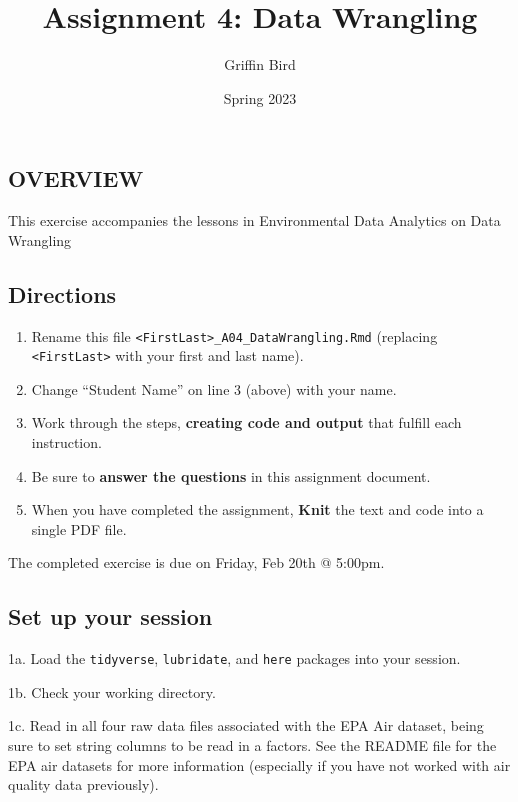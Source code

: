 \documentclass[
]{article}
\title{Assignment 4: Data Wrangling}
\author{Griffin Bird}
\date{Spring 2023}
\providecommand{\tightlist}{%
  \setlength{\itemsep}{0pt}\setlength{\parskip}{0pt}}
\begin{document}
\maketitle

\hypertarget{overview}{%
\subsection{OVERVIEW}\label{overview}}

This exercise accompanies the lessons in Environmental Data Analytics on
Data Wrangling

\hypertarget{directions}{%
\subsection{Directions}\label{directions}}

\begin{enumerate}
\def\labelenumi{\arabic{enumi}.}
\tightlist
\item
  Rename this file
  \texttt{\textless{}FirstLast\textgreater{}\_A04\_DataWrangling.Rmd}
  (replacing \texttt{\textless{}FirstLast\textgreater{}} with your first
  and last name).
\item
  Change ``Student Name'' on line 3 (above) with your name.
\item
  Work through the steps, \textbf{creating code and output} that fulfill
  each instruction.
\item
  Be sure to \textbf{answer the questions} in this assignment document.
\item
  When you have completed the assignment, \textbf{Knit} the text and
  code into a single PDF file.
\end{enumerate}

The completed exercise is due on Friday, Feb 20th @ 5:00pm.

\hypertarget{set-up-your-session}{%
\subsection{Set up your session}\label{set-up-your-session}}

1a. Load the \texttt{tidyverse}, \texttt{lubridate}, and \texttt{here}
packages into your session.

1b. Check your working directory.

1c. Read in all four raw data files associated with the EPA Air dataset,
being sure to set string columns to be read in a factors. See the README
file for the EPA air datasets for more information (especially if you
have not worked with air quality data previously).
\end{document}
